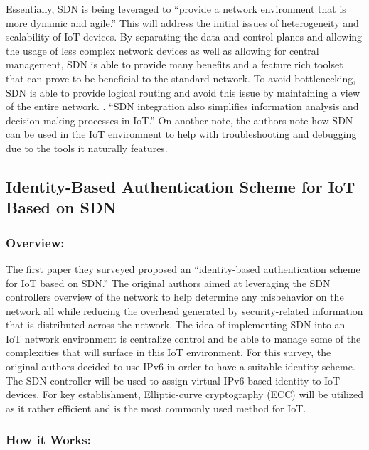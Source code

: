 \smallskip

Essentially, SDN is being leveraged to “provide a network environment that is more dynamic and agile.” \cite {kalkan2017securing} This will address the initial issues of heterogeneity and scalability of IoT devices. By separating the data and control planes and allowing the usage of less complex network devices as well as allowing for central management, SDN is able to provide many benefits and a feature rich toolset that can prove to be beneficial to the standard network. To avoid bottlenecking, SDN is able to provide logical routing and avoid this issue by maintaining a view of the entire network. . “SDN integration also simplifies information analysis and decision-making processes in IoT.” \cite {kalkan2017securing} On another note, the authors note how SDN can be used in the IoT environment to help with troubleshooting and debugging due to the tools it naturally features.

\subsection {Identity-Based Authentication Scheme for IoT Based on SDN}
\subsubsection {Overview:}
\smallskip

The first paper they surveyed proposed an “identity-based authentication scheme for IoT based on SDN.” \cite {kalkan2017securing} The original authors aimed at leveraging the SDN controllers overview of the network to help determine any misbehavior on the network all while reducing the overhead generated by security-related information that is distributed across the network. The idea of implementing SDN into an IoT network environment is centralize control and be able to manage some of the complexities that will surface in this IoT environment. For this survey, the original authors decided to use IPv6 in order to have a suitable identity scheme. The SDN controller will be used to assign virtual IPv6-based identity to IoT devices. \cite {salman2016identity} For key establishment, Elliptic-curve cryptography (ECC) will be utilized as it rather efficient and is the most commonly used method for IoT. 

\subsubsection {How it Works:}
\smallskip

